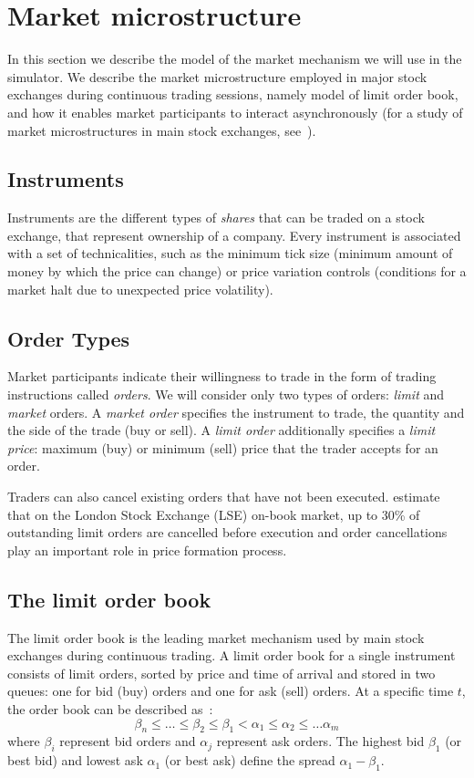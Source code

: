 \section{Market microstructure}
\label{Chapters/Background/Market-Microstructure}

In this section we describe the model of the market mechanism we will use in the simulator. We describe the market microstructure employed in major stock exchanges during continuous trading sessions, namely model of limit order book, and how it enables market participants to interact asynchronously (for a study of market microstructures in main stock exchanges, see~\cite{Comerton2004}). 


\subsection{Instruments}
Instruments are the different types of \textit{shares} that can be traded on a stock exchange, that represent ownership of a company. Every instrument is associated with a set of technicalities, such as the minimum tick size (minimum amount of money by which the price can change) or price variation controls (conditions for a market halt due to unexpected price volatility).

\subsection{Order Types}
Market participants indicate their willingness to trade in the form of trading instructions called \textit{orders}. We will consider only two types of orders: \textit{limit} and \textit{market} orders. A \textit{market order} specifies the instrument to trade, the quantity and the side of the trade (buy or sell). A \textit{limit order} additionally specifies a \textit{limit price}: maximum (buy) or minimum (sell) price that the trader accepts for an order. 

Traders can also cancel existing orders that have not been executed. \citet{Lilo2004} estimate that on the London Stock Exchange (LSE) on-book market, up to 30\% of outstanding limit orders are cancelled before execution and order cancellations play an important role in price formation process. 

\subsection{The limit order book}
The limit order book is the leading market mechanism used by main stock exchanges during continuous trading. A limit order book for a single instrument consists of limit orders, sorted by price and time of arrival and stored in two queues: one for bid (buy) orders and one for ask (sell) orders. At a specific time $t$, the order book can be described as~\cite{Gilles2006}: 
\begin{equation*}
\beta_n \leq \ldots \leq \beta_2 \leq \beta_1 < \alpha_1 \leq \alpha_2 \leq \ldots \alpha_m
\end{equation*}
where $\beta_i$ represent bid orders and $\alpha_j$ represent ask orders. The highest bid $\beta_1$ (or best bid) and lowest ask $\alpha_1$ (or best ask) define the spread $\alpha_1 - \beta_1$.

